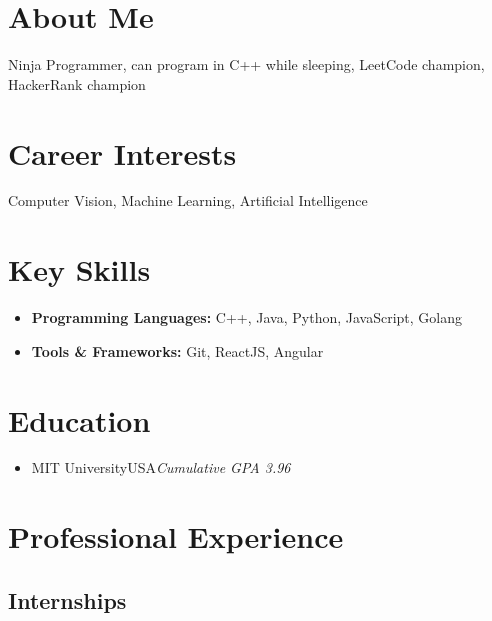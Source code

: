 \documentclass[11pt,a4paper,roman]{moderncv}
\begin{document}
\makecvtitle

\section{About Me}
% 
\small{Ninja Programmer, can program in C++ while sleeping, LeetCode champion, HackerRank champion}

\section{Career Interests}
% 
\small{Computer Vision, Machine Learning, Artificial Intelligence}

\section{Key Skills}
% 
\begin{itemize}
	\item
	\small{\textbf{Programming Languages: }  C++, Java, Python, JavaScript, Golang}
	\item
	\small{\textbf{Tools \& Frameworks: }  Git, ReactJS, Angular}
\end{itemize}
% 

\section{Education}

\begin{itemize}
	\item{
	{MIT University}{USA}{\textit{Cumulative GPA 3.96}}{}}
\end{itemize}

\section{Professional Experience}

\vspace{5pt}
\subsection{Internships}
\end{document}
